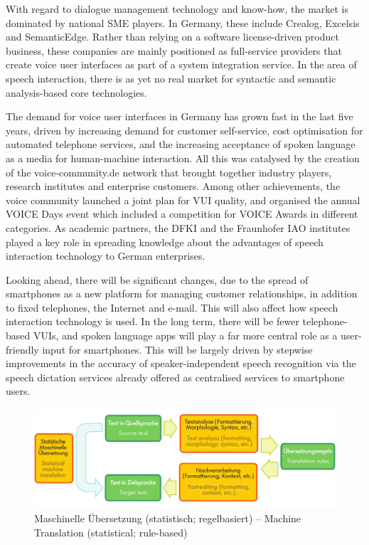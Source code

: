 \documentclass[]{../../metanetpaper}
\begin{document}
\begin{Parallel}[c]{79mm}{78mm}
{    With regard to dialogue management technology and know-how, the market is dominated by national SME players. In Germany, these include Crealog, Excelsis and SemanticEdge. Rather than relying on a software license-driven product business, these companies are mainly positioned as full-service providers that create voice user interfaces as part of a system integration service. In the area of speech interaction, there is as yet no real market for syntactic and semantic analysis-based core technologies.

    The demand for voice user interfaces in Germany has grown fast in the last five years, driven by increasing demand for customer self-service, cost optimisation for automated telephone services, and the increasing acceptance of spoken language as a media for human-machine interaction. All this was catalysed by the creation of the voice-community.de network that brought together industry players, research institutes and enterprise customers. Among other achievements, the voice community launched a joint plan for VUI quality, and organised the annual VOICE Days event which included a competition for VOICE Awards in different categories. As academic partners, the DFKI and the Fraunhofer IAO institutes played a key role in spreading knowledge about the advantages of speech interaction technology to German enterprises.

    Looking ahead, there will be significant changes, due to the spread of smartphones as a new platform for managing customer relationships, in addition to fixed telephones, the Internet and e-mail. This will also affect how speech interaction technology is used. In the long term, there will be fewer telephone-based VUIs, and spoken language apps will play a far more central role as a user-friendly input for smartphones. This will be largely driven by stepwise improvements in the accuracy of speaker-independent speech recognition via the speech dictation services already offered as centralised services to smartphone users.
  }
  
  \ParallelPar


\begin{figure}[h!]
  \center
  \includegraphics[width=\textwidth]{../_media/machine_translation}
  \caption{Maschinelle Übersetzung (statistisch; regelbasiert) -- Machine Translation (statistical; rule-based)}
  \label{fig:mtarch}
\end{figure}


\end{Parallel}
\end{document}
